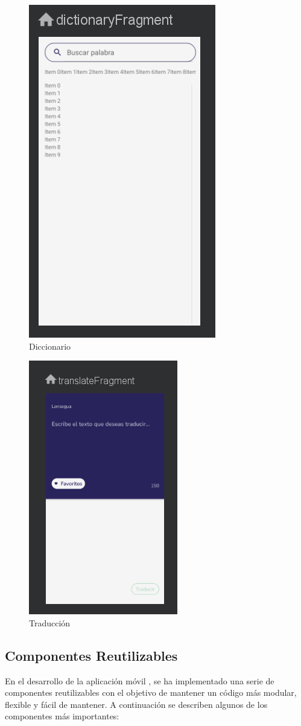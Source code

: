 \begin{figure} [H]
    \centering
    \includegraphics[width=0.2\linewidth]{figuras/diccionario.png}
    \caption{Diccionario}
    \label{fig:enter-label}
\end{figure}


\begin{figure} [H]
    \centering
    \includegraphics[width=0.2\linewidth]{figuras/tarduccion.png}
    \caption{Traducción}
    \label{fig:enter-label}
\end{figure}



\subsection{Componentes Reutilizables}

En el desarrollo de la aplicación móvil , se ha implementado una serie de componentes reutilizables con el objetivo de mantener un código más modular, flexible y fácil de mantener. A continuación se describen algunos de los componentes más importantes:

